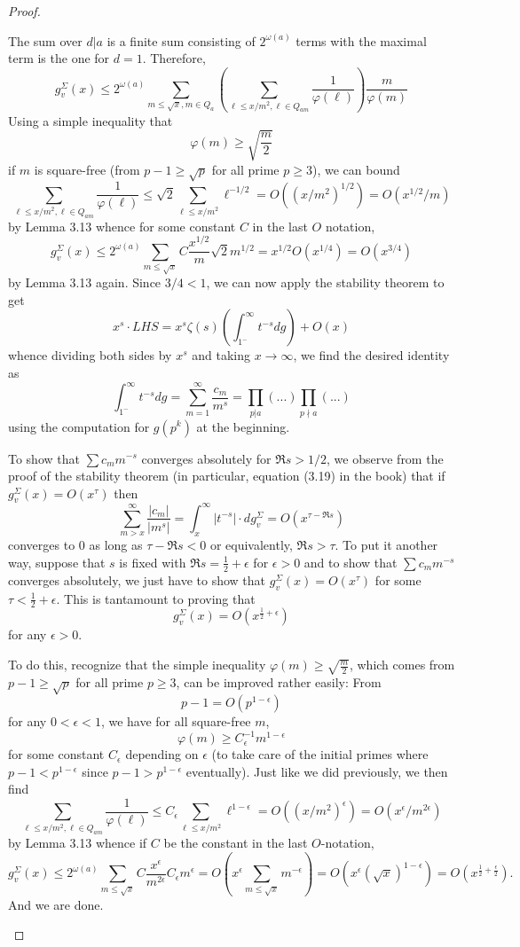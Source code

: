 \documentclass[12pt]{article}
\begin{document}
\begin{proof}
\begin{enumerate}
The sum over $d | a$ is a finite sum consisting of $2^{\omega(a)}$ terms with the maximal term is the one for $d = 1$. Therefore,
$$g^\Sigma_v(x) \leq 2^{\omega(a)} \sum_{m \leq \sqrt{x}, m \in Q_a} \left(\sum_{\ell \leq x/m^2, \ell \in Q_{am}} \frac{1}{\varphi(\ell)} \right) \frac{m}{\varphi(m)}$$
Using a simple inequality that
$$\varphi(m) \geq \sqrt{\frac m 2}$$
if $m$ is square-free (from $p - 1 \geq \sqrt{p}$ for all prime $p \geq 3$), we can bound
$$\sum_{\ell \leq x/m^2, \ell \in Q_{am}} \frac{1}{\varphi(\ell)} \leq \sqrt{2} \sum_{\ell \leq x/m^2} \ell^{-1/2} = O((x/m^2)^{1/2}) = O(x^{1/2} / m)$$
by Lemma 3.13 whence for some constant $C$ in the last $O$ notation,
$$g^\Sigma_v(x) \leq 2^{\omega(a)} \sum_{m \leq \sqrt{x}} C \frac{x^{1/2}}{m} \sqrt{2} m^{1/2} = x^{1/2} O(x^{1/4}) = O(x^{3/4})$$
by Lemma 3.13 again. Since $3/4 < 1$, we can now apply the stability theorem to get
$$x^s \cdot LHS = x^s \zeta(s) \left(\int_{1^-}^{\infty} t^{-s} dg\right) + O(x)$$
whence dividing both sides by $x^s$ and taking $x \rightarrow \infty$, we find the desired identity as
$$\int_{1^-}^{\infty} t^{-s} dg = \sum_{m = 1}^{\infty} \frac{c_m}{m^s} = \prod_{p | a} (...) \prod_{p \nmid a} (...)$$
using the computation for $g(p^k)$ at the beginning.

To show that $\sum c_m m^{-s}$ converges absolutely for $\Re s > 1/2$, we observe from the proof of the stability theorem (in particular, equation (3.19) in the book) that if $g^\Sigma_v(x) = O(x^\tau)$ then 
$$\sum_{m > x}^{\infty} \frac{|c_m|}{|m^s|} = \int_{x}^{\infty} |t^{-s}| \cdot d g^\Sigma_v = O(x^{\tau - \Re s})$$
converges to 0 as long as $\tau - \Re s < 0$ or equivalently, $\Re s > \tau$. To put it another way, suppose that $s$ is fixed with $\Re s = \frac12 + \epsilon$ for $\epsilon > 0$ and to show that $\sum c_m m^{-s}$ converges absolutely, we just have to show that $g^\Sigma_v(x) = O(x^\tau)$ for some $\tau < \frac12 + \epsilon$. This is tantamount to proving that
$$g^\Sigma_v(x) = O(x^{\frac12 + \epsilon})$$
for any $\epsilon > 0$.

To do this, recognize that the simple inequality $\varphi(m) \geq \sqrt{\frac m 2}$, which comes from $p - 1 \geq \sqrt{p}$ for all prime $p \geq 3$, can be improved rather easily: From
$$p - 1 = O(p^{1-\epsilon})$$
for any $0 < \epsilon < 1$, we have for all square-free $m$,
$$\varphi(m) \geq C_\epsilon^{-1} m^{1 - \epsilon}$$
for some constant $C_\epsilon$ depending on $\epsilon$ (to take care of the initial primes where $p - 1 < p^{1-\epsilon}$ since $p - 1 > p^{1-\epsilon}$ eventually). Just like we did previously, we then find
$$\sum_{\ell \leq x/m^2, \ell \in Q_{am}} \frac{1}{\varphi(\ell)} \leq C_\epsilon \sum_{\ell \leq x/m^2} \ell^{1 - \epsilon} = O((x/m^2)^{\epsilon}) = O(x^\epsilon/m^{2\epsilon})$$
by Lemma 3.13 whence if $C$ be the constant in the last $O$-notation,
$$g^\Sigma_v(x) \leq 2^{\omega(a)} \sum_{m \leq \sqrt{x}} C \frac{x^\epsilon}{m^{2\epsilon}} C_\epsilon m^\epsilon = O\left(x^{\epsilon} \sum_{m \leq \sqrt{x}} m^{-\epsilon}\right) = O(x^\epsilon (\sqrt x)^{1-\epsilon}) = O(x^{\frac 1 2 + \frac \epsilon 2}).$$
And we are done.


\end{enumerate}
\end{proof}
\end{document}
